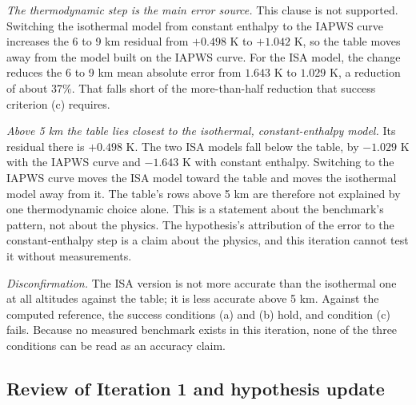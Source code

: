 \documentclass[11pt,letterpaper]{article}
\begin{document}
\emph{The thermodynamic step is the main error source.} This clause is not supported. Switching the isothermal model from constant enthalpy to the IAPWS curve increases the 6 to 9 km residual from $+0.498$ K to $+1.042$ K, so the table moves away from the model built on the IAPWS curve. For the ISA model, the change reduces the 6 to 9 km mean absolute error from $1.643$ K to $1.029$ K, a reduction of about 37\%. That falls short of the more-than-half reduction that success criterion (c) requires.

\emph{Above 5 km the table lies closest to the isothermal, constant-enthalpy model.} Its residual there is $+0.498$ K. The two ISA models fall below the table, by $-1.029$ K with the IAPWS curve and $-1.643$ K with constant enthalpy. Switching to the IAPWS curve moves the ISA model toward the table and moves the isothermal model away from it. The table's rows above 5 km are therefore not explained by one thermodynamic choice alone. This is a statement about the benchmark's pattern, not about the physics. The hypothesis's attribution of the error to the constant-enthalpy step is a claim about the physics, and this iteration cannot test it without measurements.

\emph{Disconfirmation.} The ISA version is not more accurate than the isothermal one at all altitudes against the table; it is less accurate above 5 km. Against the computed reference, the success conditions (a) and (b) hold, and condition (c) fails. Because no measured benchmark exists in this iteration, none of the three conditions can be read as an accuracy claim.

\subsection{Review of Iteration 1 and hypothesis update}
\end{document}
